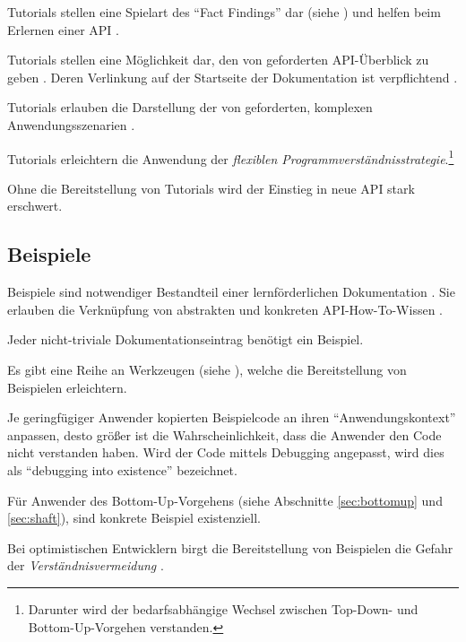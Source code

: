   Tutorials stellen eine Spielart des ``Fact Findings'' \citep{LaToza:2007fj} dar (siehe ) und helfen beim Erlernen einer API \citep{McLellan:1998cu}.
  
  Tutorials stellen eine Möglichkeit dar, den von \cite{Robillard:2010bh} geforderten API-Überblick zu geben \citep{Nykaza:2002im}. Deren Verlinkung auf der Startseite der Dokumentation ist verpflichtend \citep{Watson:2012es}.
  
  Tutorials erlauben die Darstellung der von \cite{Robillard:2009cs} geforderten, komplexen Anwendungsszenarien \citep{DaqingHou:2005ba}.
  
  Tutorials erleichtern die Anwendung der \textit{flexiblen Programmverständnisstrategie}.\footnote{Darunter wird der bedarfsabhängige Wechsel zwischen Top-Down- und Bottom-Up-Vorgehen verstanden.} \citep{Shaft:1998tc}
  
  Ohne die Bereitstellung von Tutorials wird der Einstieg in neue API stark erschwert. \citep{DaqingHou:2005ba}
  

\subsection{Beispiele}
  
  Beispiele sind notwendiger Bestandteil einer lernförderlichen Dokumentation \citep{Tenny:1988ir,Jeong:kf,Shull:2000fy,McLellan:1998cu,Nykaza:2002im}. Sie erlauben die Verknüpfung von abstrakten und konkreten API-How-To-Wissen \citep{Shaft:1998tc}.
  
  Jeder nicht-triviale Dokumentationseintrag benötigt ein Beispiel. \citep{DaqingHou:2005ba}
  
  Es gibt eine Reihe an Werkzeugen (siehe ), welche die Bereitstellung von Beispielen erleichtern.
  
  Je geringfügiger Anwender kopierten Beispielcode an ihren ``Anwendungskontext'' anpassen, desto größer ist die Wahrscheinlichkeit, dass die Anwender den Code nicht verstanden haben. Wird der Code mittels Debugging angepasst, wird dies als ``debugging into existence'' bezeichnet. \citep{Rosson:1996da}

  Für Anwender des Bottom-Up-Vorgehens (siehe Abschnitte \ref{sec:bottomup} und \ref{sec:shaft}), sind konkrete Beispiel existenziell. \citep{Rosson:1996da}
  
  Bei optimistischen Entwicklern birgt die Bereitstellung von Beispielen die Gefahr der \textit{Verständnisvermeidung} \citep[siehe ,][]{Rosson:1996da,Stylos:2008jt}.
  

